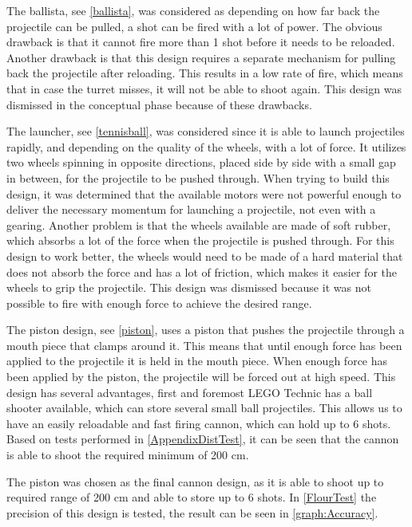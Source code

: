 The ballista, see \autoref{ballista}, was considered as
depending on how far back the projectile can be pulled, a shot can be fired with a lot of power. The obvious drawback is that it cannot fire more than 1 shot before it needs to be reloaded. Another drawback is that this design requires a separate mechanism for pulling back the projectile after reloading. This results in a low rate of fire, which means that in case the turret misses, it will not be able to shoot again. This design was dismissed in the conceptual phase because of these drawbacks.\nl

The launcher, see \autoref{tennisball}, was considered since it is able to launch
projectiles rapidly, and depending on the quality of the wheels, with a lot of force. It utilizes two wheels spinning in opposite directions, placed side by side with a small gap in between, for the projectile to be pushed through. When trying to build this design, it was determined that the available motors were not powerful enough to deliver the necessary momentum for launching a projectile, not even with a gearing. Another problem is that the wheels available are made of soft rubber, which absorbs a lot of the force when the projectile is pushed through. For this design to work better, the wheels would need to be made of a hard material that does not absorb the force and has a lot of friction, which makes it easier for the wheels to grip the projectile. This design was dismissed because it was not possible to fire with enough force to achieve the desired range.\nl

The piston design, see \autoref{piston}, uses a piston that pushes the
projectile through a mouth piece that clamps around it. This means that until enough force has been applied to the projectile it is held in the mouth piece. When enough force has been applied by the piston, the projectile will be forced out at high speed. This
design has several advantages, first and foremost LEGO Technic has a ball shooter available, which can store several small ball projectiles. This allows us to have an easily reloadable and fast firing cannon, which can hold up to 6 shots. Based on tests performed in \autoref{AppendixDistTest}, it can be seen that the cannon is able to shoot the required minimum of 200 cm.


The piston was chosen as the final cannon design, as it is able to shoot up to
required range of 200 cm and able to store up to 6 shots. In \autoref{FlourTest}
the precision of this design is tested, the result can be seen in
\autoref{graph:Accuracy}.

